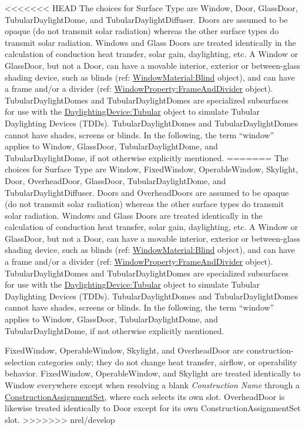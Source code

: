 <<<<<<< HEAD
The choices for Surface Type are Window, Door, GlassDoor, TubularDaylightDome, and TubularDaylightDiffuser. Doors are assumed to be opaque (do not transmit solar radiation) whereas the other surface types do transmit solar radiation. Windows and Glass Doors are treated identically in the calculation of conduction heat transfer, solar gain, daylighting, etc. A Window or GlassDoor, but not a Door, can have a movable interior, exterior or between-glass shading device, such as blinds (ref: \hyperref[windowmaterialblind]{WindowMaterial:Blind} object), and can have a frame and/or a divider (ref: \hyperref[windowpropertyframeanddivider]{WindowProperty:FrameAndDivider} object). TubularDaylightDomes and TubularDaylightDomes are specialized subsurfaces for use with the \hyperref[daylightingdevicetubular]{DaylightingDevice:Tubular} object to simulate Tubular Daylighting Devices (TDDs). TubularDaylightDomes and TubularDaylightDomes cannot have shades, screens or blinds. In the following, the term ``window'' applies to Window, GlassDoor, TubularDaylightDome, and TubularDaylightDome, if not otherwise explicitly mentioned.
=======
The choices for Surface Type are Window, FixedWindow, OperableWindow, Skylight, Door, OverheadDoor, GlassDoor, TubularDaylightDome, and TubularDaylightDiffuser. Doors and OverheadDoors are assumed to be opaque (do not transmit solar radiation) whereas the other surface types do transmit solar radiation. Windows and Glass Doors are treated identically in the calculation of conduction heat transfer, solar gain, daylighting, etc. A Window or GlassDoor, but not a Door, can have a movable interior, exterior or between-glass shading device, such as blinds (ref: \hyperref[windowmaterialblind]{WindowMaterial:Blind} object), and can have a frame and/or a divider (ref: \hyperref[windowpropertyframeanddivider]{WindowProperty:FrameAndDivider} object). TubularDaylightDomes and TubularDaylightDomes are specialized subsurfaces for use with the \hyperref[daylightingdevicetubular]{DaylightingDevice:Tubular} object to simulate Tubular Daylighting Devices (TDDs). TubularDaylightDomes and TubularDaylightDomes cannot have shades, screens or blinds. In the following, the term ``window'' applies to Window, GlassDoor, TubularDaylightDome, and TubularDaylightDome, if not otherwise explicitly mentioned.

FixedWindow, OperableWindow, Skylight, and OverheadDoor are construction-selection categories only; they do not change heat transfer, airflow, or operability behavior. FixedWindow, OperableWindow, and Skylight are treated identically to Window everywhere except when resolving a blank \emph{Construction Name} through a \hyperref[constructionassignmentset]{ConstructionAssignmentSet}, where each selects its own slot. OverheadDoor is likewise treated identically to Door except for its own ConstructionAssignmentSet slot.
>>>>>>> nrel/develop

